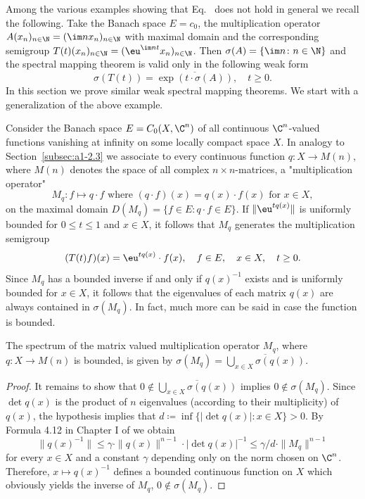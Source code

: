 Among the various examples showing that Eq.~ does not hold in general we recall the following.
Take the Banach space $E = c_{0}$, the multiplication operator $A(x_{n})_{n\in\N} = (\im n x_{n})_{n\in\N}$ with maximal domain and the corresponding semigroup $T(t)(x_{n})_{n \in \N} = 
(\eu^{\im nt}x_{n})_{n \in \N}$.
Then $\sigma(A) = \{\im n \colon n \in \N\}$ and the spectral mapping theorem is valid only in the following weak form
\begin{equation}\label{eq:a3-7.2}
	\sigma(T(t)) = \overline{\exp(t\cdot\sigma(A))}, \quad t \geq 0 .
\end{equation}
In this section we prove similar weak spectral mapping theorems.
We start with a generalization of the above example.

Consider the Banach space $E = C_{0}(X,\C^{n})$ of all continuous $\C^{n}$-valued functions vanishing at infinity on some locally compact space $X$.
In analogy to Section~\ref{subsec:a1-2.3} we associate to every continuous function $q \colon X \to M(n)$, where $M(n)$ denotes the space of all complex $n\times n$-matrices, a "multiplication operator" 
\[
M_{q} \colon f \mapsto q\cdot f \text{ where } (q\cdot f)(x) = q(x)\cdot f(x) \text{ for } x \in X , 
\]
on the maximal domain $D(M_{q}) = \{f \in E \colon q\cdot f \in E\}$.
If\/ $\|\eu^{tq(x)}\|$ is uniformly bounded for $0 \leq t \leq 1$ and $x \in X$, it follows that $M_{q}$ generates the multiplication semigroup
\[
	(T(t)f)(x) = \eu^{tq(x)}\cdot f(x), \quad f \in E, \quad x \in X, \quad t \geq 0 .
\]
Since $M_{q}$ has a bounded inverse if and only if\/ $q(x)^{-1}$ exists and is uniformly bounded for $x \in X$, it follows that the eigenvalues of each matrix $q(x)$ are always contained in $\sigma(M_{q})$.
In fact, much more can be said in case the function is bounded.
\begin{lemma}\label{lem:a3-7.1}
The spectrum of the matrix valued multiplication operator $M_{q}$, where $q \colon X \to M(n)$ is bounded, is given by $\sigma(M_{q}) = \overline{\bigcup_{x\in X} \sigma(q(x))}$. 
\end{lemma}
\begin{proof}
It remains to show that $0 \notin \overline{\bigcup_{x\in X} \sigma(q(x))}$ implies $0 \notin \sigma(M_{q})$.
Since $\det q(x)$ is the product of\/ $n$ eigenvalues (according to their multiplicity) of\/ $q(x)$, the hypothesis implies that $d \coloneq \inf\{|\det q(x)| \colon x \in X\} > 0$.
By Formula 4.12 in Chapter I of \textcite{kato:1976} we obtain
\[
\|q(x)^{-1}\| \leq \gamma \cdot \|q(x)\|^{n-1} \cdot |\det q(x)|^{-1} \leq \gamma/d \cdot \|M_{q}\|^{n-1}
\]
for every $x \in X$ and a constant $\gamma$ depending only on the norm chosen on $\C^{n}$.
Therefore, $x \mapsto q(x)^{-1}$ defines a bounded continuous function on $X$ which obviously yields the inverse of\/ $M_{q}$, \ie $0 \notin \sigma(M_{q})$.
\end{proof}
